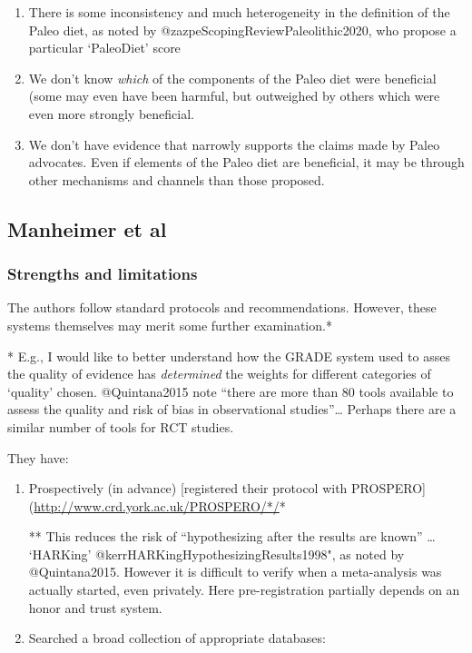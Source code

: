 \documentclass[]{article}
\providecommand{\tightlist}{%
  \setlength{\itemsep}{0pt}\setlength{\parskip}{0pt}}
\begin{document}
\begin{enumerate}
\def\labelenumi{\arabic{enumi}.}
\item
  There is some inconsistency and much heterogeneity in the definition
  of the Paleo diet, as noted by @zazpeScopingReviewPaleolithic2020, who
  propose a particular `PaleoDiet' score
\item
  We don't know \emph{which} of the components of the Paleo diet were
  beneficial (some may even have been harmful, but outweighed by others
  which were even more strongly beneficial.
\item
  We don't have evidence that narrowly supports the claims made by Paleo
  advocates. Even if elements of the Paleo diet are beneficial, it may
  be through other mechanisms and channels than those proposed.
\end{enumerate}

\hypertarget{manheimer}{%
\subsection{Manheimer et al}\label{manheimer}}

\hypertarget{strengths-and-limitations}{%
\subsubsection{Strengths and
limitations}\label{strengths-and-limitations}}

The authors follow standard protocols and recommendations. However,
these systems themselves may merit some further examination.*

* E.g., I would like to better understand how the GRADE system used to
asses the quality of evidence has \emph{determined} the weights for
different categories of `quality' chosen. @Quintana2015 note ``there are
more than 80 tools available to assess the quality and risk of bias in
observational studies''\ldots{} Perhaps there are a similar number of
tools for RCT studies.

They have:

\begin{enumerate}
\def\labelenumi{\arabic{enumi}.}
\tightlist
\item
  Prospectively (in advance) {[}registered their protocol with
  PROSPERO{]}(\url{http://www.crd.york.ac.uk/PROSPERO/*/}*

  ** This reduces the risk of ``hypothesizing after the results are
  known'' \ldots{} `HARKing' @kerrHARKingHypothesizingResults1998", as
  noted by @Quintana2015. However it is difficult to verify when a
  meta-analysis was actually started, even privately. Here
  pre-registration partially depends on an honor and trust system.
\item
  Searched a broad collection of appropriate databases:
\end{enumerate}
\end{document}
